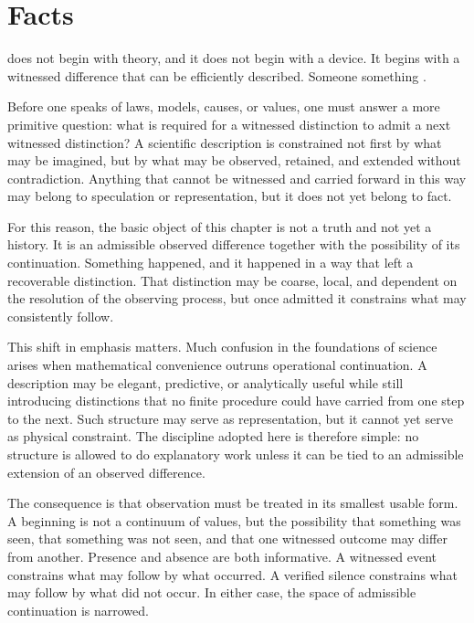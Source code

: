 \chapter{Facts}

 does not begin with theory, and it does not begin with a device.
It begins with a witnessed difference that can be efficiently described.
Someone  something .

Before one speaks of laws, models, causes, or values, one must answer a more
primitive question: what is required for a witnessed distinction to admit a
next witnessed distinction? A scientific description is constrained not first
by what may be imagined, but by what may be observed, retained, and extended
without contradiction. Anything that cannot be witnessed and carried forward
in this way may belong to speculation or representation, but it does not yet
belong to fact.

For this reason, the basic object of this chapter is not a truth and not yet a
history. It is an admissible observed difference together with the possibility
of its continuation. Something happened, and it happened in a way that left a
recoverable distinction. That distinction may be coarse, local, and dependent
on the resolution of the observing process, but once admitted it constrains
what may consistently follow.

This shift in emphasis matters. Much confusion in the foundations of science
arises when mathematical convenience outruns operational continuation. A
description may be elegant, predictive, or analytically useful while still
introducing distinctions that no finite procedure could have carried from one
step to the next. Such structure may serve as representation, but it cannot
yet serve as physical constraint. The discipline adopted here is therefore
simple: no structure is allowed to do explanatory work unless it can be tied
to an admissible extension of an observed difference.

The consequence is that observation must be treated in its smallest usable
form. A beginning is not a continuum of values, but the possibility that
something was seen, that something was not seen, and that one witnessed
outcome may differ from another. Presence and absence are both informative.
A witnessed event constrains what may follow by what occurred. A verified
silence constrains what may follow by what did not occur. In either case, the
space of admissible continuation is narrowed.

